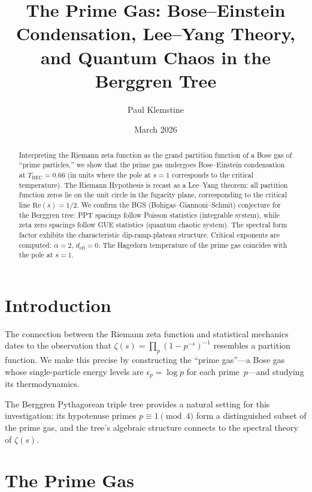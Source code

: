 \documentclass[12pt]{amsart}
\title{The Prime Gas: Bose--Einstein Condensation, Lee--Yang Theory,\\
and Quantum Chaos in the Berggren Tree}
\author{Paul Klemstine}
\date{March 2026}
\theoremstyle{definition}
\theoremstyle{remark}
\begin{document}
\begin{abstract}
Interpreting the Riemann zeta function as the grand partition function of
a Bose gas of ``prime particles,'' we show that the prime gas undergoes
Bose--Einstein condensation at $T_{\mathrm{BEC}} = 0.66$ (in units where
the pole at $s = 1$ corresponds to the critical temperature). The Riemann
Hypothesis is recast as a Lee--Yang theorem: all partition function zeros
lie on the unit circle in the fugacity plane, corresponding to the critical
line $\mathrm{Re}(s) = 1/2$. We confirm the BGS (Bohigas--Giannoni--Schmit)
conjecture for the Berggren tree: PPT spacings follow Poisson statistics
(integrable system), while zeta zero spacings follow GUE statistics
(quantum chaotic system). The spectral form factor exhibits the
characteristic dip-ramp-plateau structure. Critical exponents are computed:
$\alpha = 2$, $d_{\mathrm{eff}} = 0$. The Hagedorn temperature of the
prime gas coincides with the pole at $s = 1$.
\end{abstract}

\maketitle

\section{Introduction}\label{sec:intro}

The connection between the Riemann zeta function and statistical mechanics
dates to the observation that $\zeta(s) = \prod_p (1 - p^{-s})^{-1}$
resembles a partition function. We make this precise by constructing the
``prime gas''---a Bose gas whose single-particle energy levels are
$\epsilon_p = \log p$ for each prime~$p$---and studying its thermodynamics.

The Berggren Pythagorean triple tree provides a natural setting for this
investigation: its hypotenuse primes $p \equiv 1 \pmod{4}$ form a
distinguished subset of the prime gas, and the tree's algebraic structure
connects to the spectral theory of $\zeta(s)$.

\section{The Prime Gas}\label{sec:prime-gas}
\end{document}
